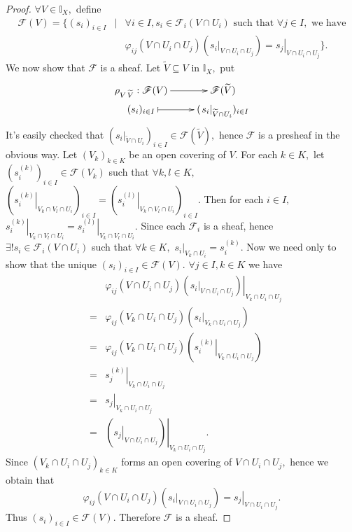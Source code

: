 \begin{proof}
$\forall V\in \mathds{I}_X,$ define
\begin{eqnarray*}
\mathscr{F}(V)=\{(s_i)_{i\in I}\!\! & \mid & \!\!\forall i\in
I,s_i\in\mathscr{F}_i(V\cap U_i)\text{ such that }\forall j\in I,
\text{ we have}                                                \\
& & \varphi_{ij}(V\cap U_i\cap U_j)(\left.s_i\right|_{V\cap U_i\cap
U_j})=\left.s_j\right|_{V\cap U_i\cap U_j}\}.
\end{eqnarray*}
We now show that $\mathscr{F}$ is a sheaf. Let
$\widetilde{V}\subseteq V$ in $\mathds{I}_X,$ put
\[ \xymatrix@R=0em{
   {\rho_{V\,\widetilde{V}}: \mathscr{F}(V)} \ar[r] &
   \mathscr{F}(\widetilde{V})                           \\
   (s_i)_{i\in I} \ar@{|->}[r] & (\left.s_i\right|_{\widetilde{V}\cap U_i})_{i\in I}
   }  \]
It's easily checked that $(\left.s_i\right|_{\widetilde{V}\cap
U_i})_{i\in I}\in \mathscr{F}(\widetilde{V}),$ hence $\mathscr{F}$
is a presheaf in the obvious way. Let $(V_k)_{k\in K}$ be an open
covering of $V.$ For each $k\in K,$ let $(s_i^{(k)})_{i\in I}\in
\mathscr{F}(V_k)$ such that $\forall k,l\in K,$
$(\left.s_i^{(k)}\right|_{V_k\cap V_l\cap U_i})_{i\in
I}=(\left.s_i^{(l)}\right|_{V_k\cap V_l\cap U_i})_{i\in I}.$ Then
for each $i\in I,$ $\left.s_i^{(k)}\right|_{V_k\cap V_l\cap
U_i}=\left.s_i^{(l)}\right|_{V_k\cap V_l\cap U_i}.$ Since each
$\mathscr{F}_i$ is a sheaf, hence $\exists
!s_i\in\mathscr{F}_i(V\cap U_i)$ such that $\forall k\in K,$
$\left.s_i\right|_{V_k\cap U_i}=s_i^{(k)}.$ Now we need only to show
that the unique $(s_i)_{i\in I}\in \mathscr{F}(V).$ $\forall j\in
I,k\in K$ we have
\begin{eqnarray*}
& & \left.\varphi_{ij}(V\cap U_i\cap U_j)(\left.s_i\right|_{V\cap
U_i\cap U_j})\right|_{V_k\cap U_i\cap U_j}                      \\
& = & \varphi_{ij}(V_k\cap U_i\cap U_j)(\left.s_i\right|_{V_k\cap U_i\cap U_j})\\
& = & \varphi_{ij}(V_k\cap U_i\cap
U_j)(\left.s_i^{(k)}\right|_{V_k\cap
U_i\cap U_j})                                                   \\
& = & \left.s_j^{(k)}\right|_{V_k\cap U_i\cap U_j}              \\
& = & \left.s_j\right|_{V_k\cap U_i\cap U_j}                    \\
& = & \left.(\left.s_j\right|_{V\cap U_i\cap U_j})\right|_{V_k\cap
U_i\cap U_j}.
\end{eqnarray*}
Since $(V_k\cap U_i\cap U_j)_{k\in K}$ forms an open covering of
$V\cap U_i\cap U_j,$ hence we obtain that
$$\varphi_{ij}(V\cap U_i\cap U_j)(\left.s_i\right|_{V\cap U_i\cap
U_j})=\left.s_j\right|_{V\cap U_i\cap U_j}.$$ Thus $(s_i)_{i\in
I}\in \mathscr{F}(V).$ Therefore $\mathscr{F}$ is a sheaf.


\end{proof}
